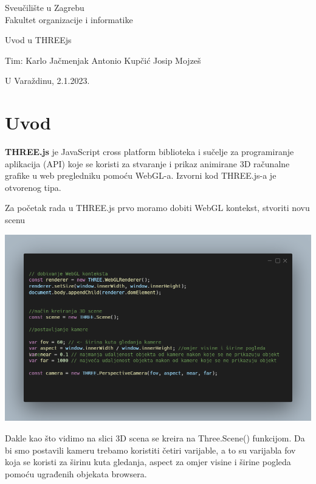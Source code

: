 \documentclass[a4paper,12pt]{article}
\begin{document}
\thispagestyle{empty}
\begin{center}
Sveučilište u Zagrebu\\
Fakultet organizacije i informatike
\end{center}
\vfill
\begin{center}
\Large Uvod u THREEjs
\end{center}
\vfill
\begin{flushright}
Tim: Karlo Jačmenjak \break
Antonio Kupčić \break
Josip Mojzeš \break
\end{flushright}
U Varaždinu, 2.1.2023. 

\newpage
\setcounter{page}{1}

\section{Uvod}
\textbf{THREE.js} je JavaScript cross platform biblioteka i sučelje za programiranje aplikacija (API) koje se koristi za stvaranje i prikaz animirane 3D računalne grafike u web pregledniku pomoću WebGL-a. Izvorni kod THREE.js-a je otvorenog tipa.

\begin{flushleft}
    Za početak rada u THREE.js prvo moramo dobiti WebGL kontekst, stvoriti novu scenu 
\end{flushleft}


\begin{center}
    \includegraphics[scale=0.5]{image/zadatak1.png}
\end{center}


Dakle kao što vidimo na slici 3D scena se kreira na Three.Scene() funkcijom. Da bi smo postavili kameru trebamo koristiti četiri varijable, a to su 
varijabla fov koja se koristi za širinu kuta gledanja, aspect za omjer visine i širine pogleda pomoću ugrađenih objekata browsera. 
\end{document}
